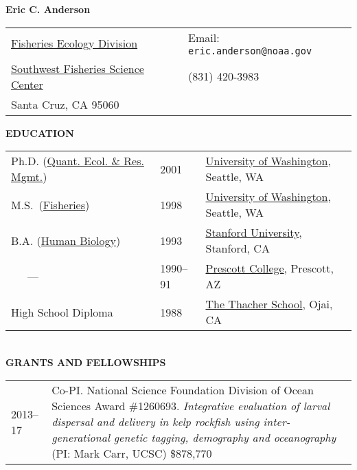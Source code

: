 \documentclass[11pt]{article}
\newlength{\myindent}
\newlength{\postskip}
\newlength{\preskip}
\newlength{\scndcol}
\begin{document}
\begin{center} \LARGE {\bf Eric C. Anderson}\\
\end{center} 
\begin{tabular*}{\textwidth}{@{\extracolsep{\fill}}ll@{}} 
\href{http://swfsc.noaa.gov/fed.aspx}{Fisheries Ecology Division}       
&
Email: \texttt{eric.anderson@noaa.gov}
\\ 
\href{http://swfsc.noaa.gov/default.aspx}{Southwest Fisheries Science Center} &         
(831) 420-3983
\\   Santa Cruz, CA  95060 
&        
  \\
\end{tabular*}
\vspace*{\postskip}
\nopagebreak

{\bf EDUCATION}
\vspace*{\preskip}\\
\begin{tabular}{@{\hspace{\myindent}}lll   }  Ph.D. (\href{http://depts.washington.edu/qerm/}{Quant. Ecol. \& Res.
Mgmt.})  &  2001   &   \href{http://www.washington.edu/}{University of Washington}, Seattle, WA
\\ M.S.~(\href{http://www.fish.washington.edu/}{Fisheries})         &    1998 & 
\href{http://www.washington.edu/}{University of Washington}, Seattle, WA
\\
B.A. (\href{http://www.stanford.edu/dept/humbio/}{Human Biology})   &  
1993 &
\href{http://www.stanford.edu/}{Stanford University}, Stanford, 
CA
\\
~~~---~~~  &  1990--91  & \href{http://www.prescott.edu/}{Prescott College}, Prescott, AZ  \\
High School Diploma  &  1988  &  \href{http://www.thacher.org/}{The Thacher School}, Ojai, CA
\end{tabular} 
\vspace*{\postskip}\\

{\bf GRANTS AND FELLOWSHIPS}
\vspace*{\preskip}\\
\begin{tabular}{ @{}p{2.5\myindent} p{\scndcol}@{}  }
\hspace*{\myindent}2013--17 &  Co-PI. National Science Foundation Division of Ocean Sciences Award \#1260693. {\em Integrative evaluation of larval dispersal and delivery in kelp rockfish using inter-generational genetic tagging, demography and oceanography} (PI: Mark Carr, UCSC)    \$878,770\\
\end{tabular}
\end{document}
